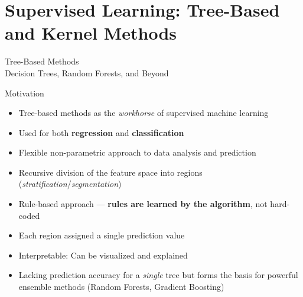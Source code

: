 \documentclass[11pt]{beamer}
\begin{document}

\section{Supervised Learning: Tree-Based and Kernel Methods}

\begin{frame}
	\begin{center}
		\Large
		Tree-Based Methods\\
		\vspace{0.5cm}
		\normalsize
		Decision Trees, Random Forests, and Beyond
	\end{center}
\end{frame}

\begin{frame}{Motivation}
	\begin{itemize}
		\item Tree-based methods as the \textit{workhorse} of supervised machine learning
		\item Used for both \textbf{regression} and \textbf{classification}
		\item Flexible non-parametric approach to data analysis and prediction
		\item Recursive division of the feature space into regions (\textit{stratification}/\textit{segmentation})
		\item Rule-based approach --- \textbf{rules are learned by the algorithm}, not hard-coded
		\item Each region assigned a single prediction value
		\item Interpretable: Can be visualized and explained
		\item Lacking prediction accuracy for a \textit{single} tree but forms the basis for powerful ensemble methods (Random Forests, Gradient Boosting)
	\end{itemize}
\end{frame}
\end{document}
